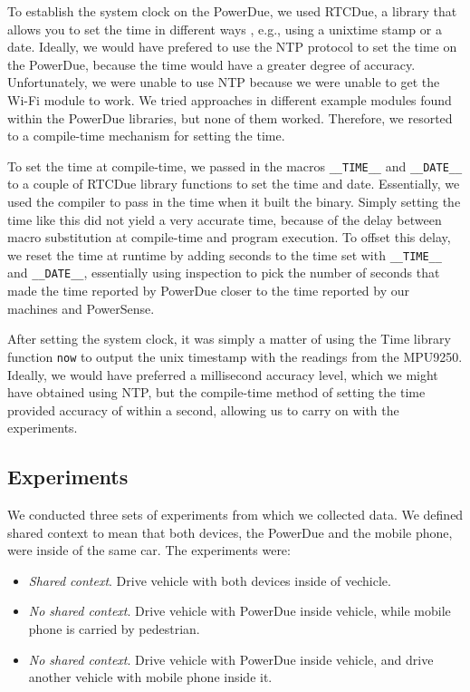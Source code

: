 \documentclass[journal]{IEEEtranTIE}
\begin{document}
To establish the system clock on the PowerDue, we used RTCDue, a library that
allows you to set the time in different ways \cite{RTCDue}, e.g., using a
unixtime stamp or a date. Ideally, we would have prefered to use the NTP
protocol to set the time on the PowerDue, because the time would have a greater
degree of accuracy. Unfortunately, we were unable to use NTP because we were
unable to get the Wi-Fi module to work. We tried approaches in different example
modules found within the PowerDue libraries, but none of them worked. Therefore,
we resorted to a compile-time mechanism for setting the time.

To set the time at compile-time, we passed in the macros \texttt{\_\_TIME\_\_}
and \texttt{\_\_DATE\_\_} to a couple of RTCDue library functions to set the
time and date. Essentially, we used the compiler to pass in the time when it
built the binary. Simply setting the time like this did not yield a very
accurate time, because of the delay between macro substitution at compile-time
and program execution. To offset this delay, we reset the time at runtime by
adding seconds to the time set with \texttt{\_\_TIME\_\_} and
\texttt{\_\_DATE\_\_}, essentially using inspection to pick the number of
seconds that made the time reported by PowerDue closer to the time reported by
our machines and PowerSense.

After setting the system clock, it was simply a matter of using the Time library
function \texttt{now} \cite{TimeLib} to output the unix timestamp with the
readings from the MPU9250. Ideally, we would have preferred a millisecond
accuracy level, which we might have obtained using NTP, but the compile-time
method of setting the time provided accuracy of within a second, allowing us to
carry on with the experiments.

\subsection{Experiments}

We conducted three sets of experiments from which we collected data. We defined
shared context to mean that both devices, the PowerDue and the mobile phone,
were inside of the same car. The experiments were:

\begin{itemize}
\item \textit{Shared context}. Drive vehicle with both devices inside of
      vechicle.
\item \textit{No shared context}. Drive vehicle with PowerDue inside vehicle,
      while mobile phone is carried by pedestrian.
\item \textit{No shared context}. Drive vehicle with PowerDue inside vehicle,
      and drive another vehicle with mobile phone inside it.
\end{itemize}
\end{document}
